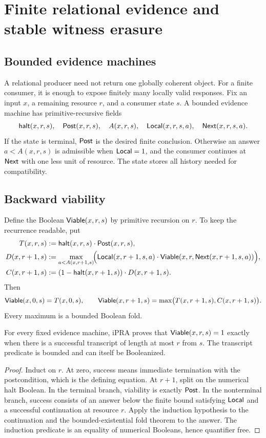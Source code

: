 \section{Finite relational evidence and stable witness erasure}\label{sec:relational}

\subsection{Bounded evidence machines}

A relational producer need not return one globally coherent object.  For a finite consumer, it is enough to expose finitely many locally valid responses.  Fix an input \(x\), a remaining resource \(r\), and a consumer state \(s\).  A bounded evidence machine has primitive-recursive fields
\[
 \mathsf{halt}(x,r,s),\quad \mathsf{Post}(x,r,s),\quad
 A(x,r,s),\quad \mathsf{Local}(x,r,s,a),\quad \mathsf{Next}(x,r,s,a).
\]
If the state is terminal, \(\mathsf{Post}\) is the desired finite conclusion.  Otherwise an answer \(a<A(x,r,s)\) is admissible when \(\mathsf{Local}=1\), and the consumer continues at \(\mathsf{Next}\) with one less unit of resource.  The state stores all history needed for compatibility.

\subsection{Backward viability}

Define the Boolean \(\mathsf{Viable}(x,r,s)\) by primitive recursion on \(r\).  To keep the recurrence readable, put
\begin{align*}
 T(x,r,s)&:=\mathsf{halt}(x,r,s)\cdot\mathsf{Post}(x,r,s),\\
 D(x,r+1,s)&:=\max_{a<A(x,r+1,s)}\!\Bigl(
   \mathsf{Local}(x,r+1,s,a)\cdot
   \mathsf{Viable}(x,r,\mathsf{Next}(x,r+1,s,a))\Bigr),\\
 C(x,r+1,s)&:=(1-\mathsf{halt}(x,r+1,s))\cdot D(x,r+1,s).
\end{align*}
Then
\[
 \mathsf{Viable}(x,0,s)=T(x,0,s),\qquad
 \mathsf{Viable}(x,r+1,s)=\max\bigl(T(x,r+1,s),C(x,r+1,s)\bigr).
\]
Every maximum is a bounded Boolean fold.

\begin{theorem}\label{thm:viability}
For every fixed evidence machine, iPRA proves that \(\mathsf{Viable}(x,r,s)=1\) exactly when there is a successful transcript of length at most \(r\) from \(s\).  The transcript predicate is bounded and can itself be Booleanized.
\end{theorem}

\begin{proof}
Induct on \(r\).  At zero, success means immediate termination with the postcondition, which is the defining equation.  At \(r+1\), split on the numerical halt Boolean.  In the terminal branch, viability is exactly \(\mathsf{Post}\).  In the nonterminal branch, success consists of an answer below the finite bound satisfying \(\mathsf{Local}\) and a successful continuation at resource \(r\).  Apply the induction hypothesis to the continuation and the bounded-existential fold theorem to the answer.  The induction predicate is an equality of numerical Booleans, hence quantifier free.
\end{proof}


